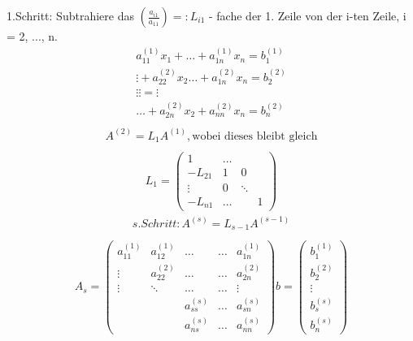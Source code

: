 1.Schritt: Subtrahiere das $\left(\frac{a_{i1}}{a_{11}}\right) =: L_{i1}$ - fache der 1. Zeile
von der i-ten Zeile, i = 2, ..., n.
\begin{align*}
    a_{11}^{(1)}x_1 + \ldots + a_{1n}^{(1)}x_n = b_1^{(1)}  \\
		\vdots                    +a_{22}^{(2)}x_2 \ldots + a_{1n}^{(2)}x_n = b_2^{(2)}  \\
    \vdots                               \vdots                     = \vdots  \\
    \ldots  + a_{2n}^{(2)}x_2 + a_{nn}^{(2)}x_n = b_n^{(2)} \\
\end{align*}
\begin{align*}
    A^{(2)} = L_1A^{(1)}, \text{wobei dieses bleibt gleich} \\
\end{align*}
\begin{align*}
    L_1 = \begin{pmatrix} 1 & \ldots &        &  \\ 
		                -L_{21} & 1      & 0      &  \\
					          \vdots	& 0      & \ddots &  \\
										-L_{n1} & \ldots &        & 1
					\end{pmatrix}
\end{align*}
\begin{align*}
		s. Schritt: A^{\left(s\right)} = L_{s-1}A^{\left(s-1\right)} \\
\end{align*}
\begin{align*}
		A_s = \begin{pmatrix}
		      a_{11}^{\left(1\right)} & a_{12}^{\left(1\right)} & \ldots & \ldots & a_{1n}^{\left(1\right)} \\
					\vdots                  & a_{22}^{\left(2\right)} & \ldots & \ldots & a_{2n}^{\left(2\right)} \\
					\vdots                  & \ddots                  & \ldots & \ldots & \vdots                  \\
					                        &                         & a_{ss}^{\left(s\right)} & \ldots  & a_{sn}^{\left(s\right)} \\
																	&                         & a_{ns}^{\left(s\right)} & \ldots  & a_{nn}^{\left(s\right)}
		      \end{pmatrix}
					b = \begin{pmatrix}b_1^{\left(1\right)} \\ b_2^{\left(2\right)} \\ \vdots \\ b_s^{\left(s\right)} \\ b_n^{\left(s\right)}\end{pmatrix}\\
\end{align*}
